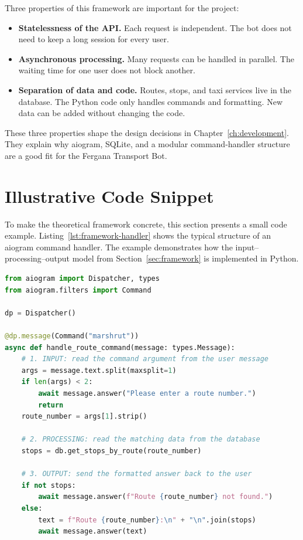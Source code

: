 Three properties of this framework are important for the project:

\begin{itemize}
    \item \textbf{Statelessness of the API.} Each request is independent.
        The bot does not need to keep a long session for every user.
    \item \textbf{Asynchronous processing.} Many requests can be handled
        in parallel. The waiting time for one user does not block
        another.\cite{python_asyncio}
    \item \textbf{Separation of data and code.} Routes, stops, and taxi
        services live in the database. The Python code only handles
        commands and formatting. New data can be added without changing
        the code.
\end{itemize}

These three properties shape the design decisions in
Chapter~\ref{ch:development}. They explain why aiogram, SQLite, and a
modular command-handler structure are a good fit for the Fergana
Transport Bot.

\section{Illustrative Code Snippet}
\label{sec:code-snippet}

To make the theoretical framework concrete, this section presents a
small code example. Listing~\ref{lst:framework-handler} shows the
typical structure of an aiogram command handler. The example
demonstrates how the input--processing--output model from
Section~\ref{sec:framework} is implemented in Python. \cite{aiogram_docs}

\begin{lstlisting}[language=Python, caption={Example of an asynchronous
    command handler in aiogram}, label={lst:framework-handler}]
from aiogram import Dispatcher, types
from aiogram.filters import Command

dp = Dispatcher()

@dp.message(Command("marshrut"))
async def handle_route_command(message: types.Message):
    # 1. INPUT: read the command argument from the user message
    args = message.text.split(maxsplit=1)
    if len(args) < 2:
        await message.answer("Please enter a route number.")
        return
    route_number = args[1].strip()

    # 2. PROCESSING: read the matching data from the database
    stops = db.get_stops_by_route(route_number)

    # 3. OUTPUT: send the formatted answer back to the user
    if not stops:
        await message.answer(f"Route {route_number} not found.")
    else:
        text = f"Route {route_number}:\n" + "\n".join(stops)
        await message.answer(text)
\end{lstlisting}

